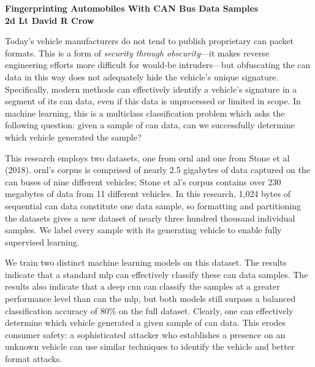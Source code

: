 \documentclass{letter}
\begin{document}
\textbf{Fingerprinting Automobiles With CAN Bus Data Samples \\ 2d Lt David R Crow}


\medskip
Today's vehicle manufacturers do not tend to publish proprietary \ac{can} packet formats. This is a form of \textit{security through obscurity}---it makes reverse engineering efforts more difficult for would-be intruders---but obfuscating the \ac{can} data in this way does not adequately hide the vehicle's unique signature. Specifically, modern methods can effectively identify a vehicle's signature in a segment of its \ac{can} data, even if this data is unprocessed or limited in scope. In machine learning, this is a multiclass classification problem which asks the following question: given a sample of \ac{can} data, can we successfully determine which vehicle generated the sample?


\medskip
This research employs two datasets, one from \ac{ornl} and one from Stone et al (2018). \ac{ornl}'s corpus is comprised of nearly 2.5 gigabytes of data captured on the \ac{can} buses of nine different vehicles; Stone et al's corpus contains over 230 megabytes of data from 11 different vehicles. In this research, 1,024 bytes of sequential \ac{can} data constitute one data sample, so formatting and partitioning the datasets gives a new dataset of nearly three hundred thousand individual samples. We label every sample with its generating vehicle to enable fully supervised learning.


\medskip
We train two distinct machine learning models on this dataset. The results indicate that a standard \ac{mlp} can effectively classify these \ac{can} data samples. The results also indicate that a deep \ac{cnn} can classify the samples at a greater performance level than can the \ac{mlp}, but both models still surpass a balanced classification accuracy of 80\% on the full dataset. Clearly, one can effectively determine which vehicle generated a given sample of \ac{can} data. This erodes consumer safety: a sophisticated attacker who establishes a presence on an unknown vehicle can use similar techniques to identify the vehicle and better format attacks.
\end{document}
